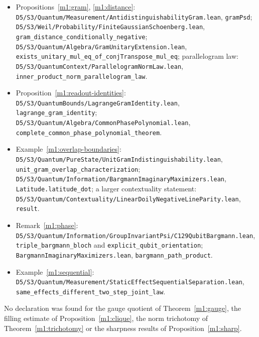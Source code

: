 \documentclass[11pt,reqno]{amsart}
\theoremstyle{definition}
\theoremstyle{remark}
\numberwithin{equation}{section}
\begin{document}
{\begin{itemize}[leftmargin=1.5em]
\item Propositions~\ref{m1:gram}, \ref{m1:distance}: \texttt{D5/S3/Quantum/Measurement/AntidistinguishabilityGram.lean}, \texttt{gramPsd};
\texttt{D5/S3/Weil/Probability/FiniteGaussianSchoenberg.lean}, \texttt{gram\_distance\_conditionally\_negative};
\texttt{D5/S3/Quantum/Algebra/GramUnitaryExtension.lean}, \texttt{exists\_unitary\_mul\_eq\_of\_conjTranspose\_mul\_eq};
parallelogram law: \texttt{D5/S3/QuantumContext/ParallelogramNormLaw.lean}, \texttt{inner\_product\_norm\_parallelogram\_law}.
\item Proposition~\ref{m1:readout-identities}: \texttt{D5/S3/QuantumBounds/LagrangeGramIdentity.lean}, \texttt{lagrange\_gram\_identity};
\texttt{D5/S3/Quantum/Algebra/CommonPhasePolynomial.lean}, \texttt{complete\_common\_phase\_polynomial\_theorem}.
\item Example~\ref{m1:overlap-boundaries}: \texttt{D5/S3/Quantum/PureState/UnitGramIndistinguishability.lean},
\texttt{unit\_gram\_overlap\_characterization}; \texttt{D5/S3/Quantum/Information/BargmannImaginaryMaximizers.lean},
\texttt{Latitude.latitude\_dot}; a larger contextuality statement: \texttt{D5/S3/Quantum/Contextuality/LinearDoilyNegativeLineParity.lean},
\texttt{result}.
\item Remark~\ref{m1:phase}: \texttt{D5/S3/Quantum/Information/GroupInvariantPsi/C129QubitBargmann.lean}, \texttt{triple\_bargmann\_bloch}
and \texttt{explicit\_qubit\_orientation}; \texttt{BargmannImaginaryMaximizers.lean}, \texttt{bargmann\_path\_product}.
\item Example~\ref{m1:sequential}: \texttt{D5/S3/Quantum/Measurement/StaticEffectSequentialSeparation.lean},
\texttt{same\_effects\_different\_two\_step\_joint\_law}.
\end{itemize}}
No declaration was found for the gauge quotient of Theorem~\ref{m1:gauge}, the filling estimate of Proposition~\ref{m1:clique}, the
norm trichotomy of Theorem~\ref{m1:trichotomy} or the sharpness results of Proposition~\ref{m1:sharp}.
\end{document}
